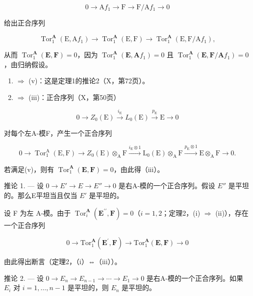 \[
0 \rightarrow \mathrm{A} f _ {1} \rightarrow \mathrm{F} \rightarrow \mathrm{F} / \mathrm{A} f _ {1} \rightarrow 0
\]

给出正合序列

\[
\operatorname{Tor} _ {1} ^ {\mathbf {A}} (\mathrm{E}, \mathrm{A} f _ {1}) \rightarrow \operatorname{Tor} _ {1} ^ {\mathbf {A}} (\mathrm{E}, \mathrm{F}) \rightarrow \operatorname{Tor} _ {1} ^ {\mathbf {A}} (\mathrm{E}, \mathrm{F} / \mathrm{A} f _ {1}),
\]

从而 \(\operatorname{Tor}_{1}^{\mathbf{A}}(\mathbf{E},\mathbf{F})=0\)，因为 \(\operatorname{Tor}_{1}^{\mathbf{A}}(\mathbf{E},\mathbf{A}f_{1})=0\) 且 \(\operatorname{Tor}_{1}^{\mathbf{A}}(\mathbf{E},\mathbf{F}/\mathbf{A}f_{1})=0\)，由归纳假设。

\begin{enumerate}
\def\labelenumi{(\roman{enumi})}
\item
  \(\Rightarrow\) (v)：这是定理1的推论2（X，第72页）。
\item
  \(\Rightarrow\) (iii)：正合序列（X，第50页）
\end{enumerate}

\[
0 \longrightarrow Z _ {0} (\mathrm{E}) \stackrel {i _ {\mathrm{E}}} {\longrightarrow} L _ {0} (\mathrm{E}) \stackrel {p _ {\mathrm{E}}} {\longrightarrow} \mathrm{E} \longrightarrow 0
\]

对每个左A-模F，产生一个正合序列

\[
0 \longrightarrow \operatorname{Tor} _ {1} ^ {\mathrm{A}} (\mathrm{E}, \mathrm{F}) \longrightarrow Z _ {0} (\mathrm{E}) \otimes_ {\mathrm{A}} \mathrm{F} \xrightarrow {i _ {\mathrm{E}} \otimes 1} \mathrm{L} _ {0} (\mathrm{E}) \otimes_ {\mathrm{A}} \mathrm{F} \xrightarrow {p _ {\mathrm{E}} \otimes 1} \mathrm{E} \otimes_ {\mathrm{A}} \mathrm{F} \longrightarrow 0.
\]

若满足(v)，则有 \(\operatorname{Tor}_1^{\mathbf{A}}(\mathbf{E},\mathbf{F}) = 0\)，由此得（iii）。

推论 1. --- 设 \(0 \to E' \to E \to E'' \to 0\) 是右A-模的一个正合序列。假设 \(E''\) 是平坦的。那么E平坦当且仅当 \(E'\) 是平坦的。

设 F 为左 A-模。由于 \(\operatorname{Tor}_i^{\mathbf{A}}(\mathbf{E}^{\prime \prime},\mathbf{F}) = 0\)（\(i = 1,2\)；定理2，(i) \(\Rightarrow\) (ii)），存在一个正合序列

\[
0 \to \mathrm{Tor} _ {1} ^ {\mathbf {A}} (\mathbf {E} ^ {\prime}, \mathbf {F}) \to \mathrm{Tor} _ {1} ^ {\mathbf {A}} (\mathbf {E}, \mathbf {F}) \to 0
\]

由此得出断言（定理2，（i）⇔（iii））。

推论 2. --- 设 \(0 \to E_n \to E_{n-1} \to \cdots \to E_1 \to 0\) 是右A-模的一个正合序列。如果 \(E_i\) 对 \(i = 1, \ldots, n-1\) 是平坦的，则 \(E_n\) 是平坦的。
\relax{}
